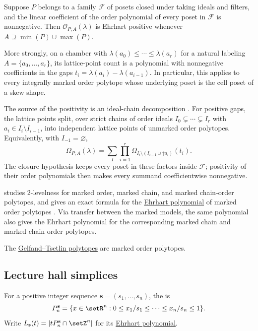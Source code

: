 \begin{theorem}
\label{markedOrderPolytopePositivity}
Suppose $P$ belongs to a family $\mathcal F$ of posets closed under taking
ideals and filters, and the linear coefficient of the order polynomial of
every poset in $\mathcal F$ is nonnegative.  Then
$\mathcal O_{P,A}(\lambda)$ is Ehrhart positive whenever
$A\supseteq\min(P)\cup\max(P)$.

More strongly, on a chamber with
$\lambda(a_0)\leq\dotsb\leq\lambda(a_r)$ for a natural labeling
$A=\{a_0,\dotsc,a_r\}$, its lattice-point count is a polynomial with
nonnegative coefficients in the gaps
$t_i=\lambda(a_i)-\lambda(a_{i-1})$.  In particular, this applies to every
integrally marked order polytope whose underlying poset is the cell poset of
a skew shape.
\end{theorem}

The source of the positivity is an ideal-chain decomposition
\cite[Prop.~2.1]{JochemkoMenon2026x}.  For positive gaps, the lattice points
split, over strict chains of order ideals
$I_0\subsetneq\dotsb\subsetneq I_r$ with
$a_i\in I_i\setminus I_{i-1}$, into independent lattice points of unmarked
order polytopes.  Equivalently, with $I_{-1}=\varnothing$,
\[
 \Omega_{P,A}(\lambda)
 =
 \sum_I \prod_{i=1}^r
 \Omega_{I_i\setminus(I_{i-1}\cup\mathord\uparrow a_i)}(t_i).
\]
The closure hypothesis keeps every poset in these factors inside
$\mathcal F$; positivity of their order polynomials then makes every summand
coefficientwise nonnegative.

 studies $2$-levelness for marked order, marked chain, and
marked chain-order polytopes, and gives an exact formula for the
\hyperref[ehrhartPolynomialDefinition]{Ehrhart polynomial} of marked order
polytopes \cite{Stricker2024x}.  Via transfer
between the marked models, the same polynomial also gives the Ehrhart
polynomial for the corresponding marked chain and marked chain-order
polytopes.

The \hyperref[gtpolytopes]{Gelfand--Tsetlin polytopes} are marked order polytopes.


\subsection[lectureHallSimplex]{Lecture hall simplices}

For a positive integer sequence $\mathbf{s}=(s_1,\dotsc,s_n)$, the
 is
\[
 P_n^{\mathbf{s}}=\{x\in\setR^n:
 0\leq x_1/s_1\leq\dotsb\leq x_n/s_n\leq1\}.
\]
Write $L_{\mathbf{s}}(t)=|tP_n^{\mathbf{s}}\cap\setZ^n|$ for its
\hyperref[ehrhartPolynomialDefinition]{Ehrhart polynomial}.

